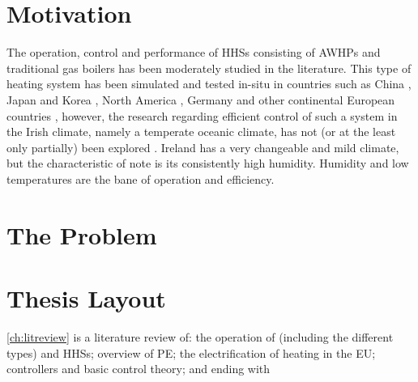 \section{Motivation}
The operation, control and performance of \acp{HHS} consisting of \acp{AWHP} and traditional gas boilers has been moderately studied in the literature. This type of heating system has been simulated and tested in-situ in countries such as China \cite{li_parallel_2018}, Japan and Korea \cite{jang_continuous_2013, park_performance_2014}, North America \cite{rauschkolb_cost-optimal_2020, }, Germany \cite{klein_numerical_2014} and other continental European countries \cite{bagarella_annual_2016, roccatello_analysis_2022, amirkhizi_cost_2020, dongellini_influence_2021,di_perna_experimental_2015}, however, the research regarding efficient control of such a system in the Irish climate, namely a temperate oceanic climate, has not (or at the least only partially) been explored \cite{heinen_electricity_2016}. Ireland has a very changeable and mild climate, but the characteristic of note is its consistently high humidity. Humidity and low temperatures are the bane of \HP operation and efficiency.

\section{The Problem} %

\section{Thesis Layout}
\cref{ch:litreview} is a literature review of: the operation of \HPs (including the different types) and \acp{HHS}; overview of \ac{PE}; the electrification of heating in the EU; controllers and basic control theory; and ending with 

